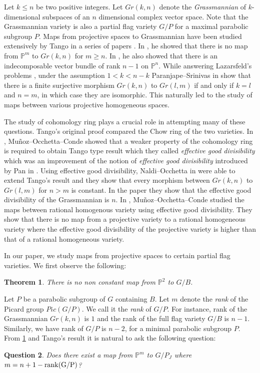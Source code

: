 \documentclass[a4paper,11pt]{amsart}
\newtheorem{theorem}{Theorem}[section]
\newtheorem{question}[theorem]{Question}
\begin{document}
Let $k \leq n$ be two positive integers. Let $Gr(k,n)$ denote the {\em Grassmannian} of $k$-dimensional subspaces of an $n$ dimensional complex vector space. Note that the Grassmannian variety is also a partial flag variety $G/P$ for a maximal parabolic subgroup $P$. Maps from projective spaces to Grassmannian have been studied extensively by Tango in a series of papers \cite{Tango1,Tango2,Tango3}. In \cite{Tango1}, he showed that there is no map from $\mathbb{P}^m$ to $Gr(k,n)$ for $m \geq n$. In \cite{Tangobundle}, he also showed that there is an indecomposable vector bundle of rank $n-1$ on $\mathbb{P}^n$. While answering Lazarsfeld's problems \cite{Lazarsfeld}, under the assumption $1< k < n-k$ Paranjape--Srinivas in \cite{srinivas} show that there is a finite surjective morphism $Gr(k,n)$ to $Gr(l,m)$ if and only if $k=l$ and $n=m$, in which case they are isomorphic. This naturally led to the study of maps between various projective homogeneous spaces. 

The study of cohomology ring plays a crucial role in attempting many of these questions. Tango's original proof compared the Chow ring of the two varieties. In \cite{Munozsplitting}, Muñoz--Occhetta--Conde showed that a weaker property of the cohomology ring is required to obtain Tango type result which they called {\em effective good divisibility} which was an improvement of the notion of {\em effective good divisibility} introduced by Pan in \cite{Pan}. Using effective good divisibility, Naldi--Occhetta in \cite{Naldi--Occhetta} were able to extend Tango's result and they show that every morphism between $Gr(k,n)$ to $Gr(l,m)$ for $n >m$ is constant. In the paper they show that the effective good divisibility of the Grassmannian is $n$. In \cite{Munoz-etal}, Muñoz--Occhetta--Conde studied the maps between rational homogenous variety using effective good divisibility. They show that there is no map from a projective variety to a rational homogeneous variety where the effective good divisibility of the projective variety is higher than that of a rational homogeneous variety. 

In our paper, we study maps from projective spaces to certain partial flag varieties. We first observe the following:

\begin{theorem}\label{mapsfromP2} There is no non constant map from $\mathbb{P}^2$ to $G/B$.
\end{theorem}

Let $P$ be a parabolic subgroup of $G$ containing $B$. Let $m$ denote the {\em rank} of the Picard group $Pic(G/P)$. We call it the {\em rank} of $G/P$. For instance, rank of the Grassmannian $Gr(k,n)$ is $1$ and the rank of the full flag variety $G/B$ is $n-1$. Similarly, we have rank of $G/P$ is $n-2$, for a minimal parabolic subgroup $P$. From \ref{mapsfromP2} and Tango's result it is natural to ask the following question:
\begin{question}\label{question} Does there exist a map from $\mathbb{P}^m$ to $G/P_J$ where $m = n+ 1 - \rm{rank}(G/P)$?
\end{question}
\end{document}
